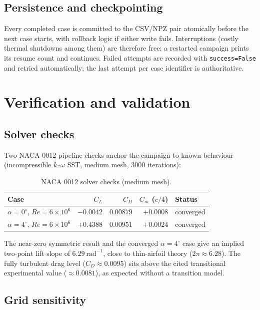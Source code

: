 \documentclass[11pt,a4paper]{article}
\begin{document}
\subsection{Persistence and checkpointing}

Every completed case is committed to the CSV/NPZ pair atomically before the
next case starts, with rollback logic if either write fails. Interruptions
(costly thermal shutdowns among them) are therefore free: a restarted
campaign prints its resume count and continues. Failed attempts are recorded
with \texttt{success=False} and retried automatically; the last attempt per
case identifier is authoritative.

\section{Verification and validation}

\subsection{Solver checks}

Two NACA 0012 pipeline checks anchor the campaign to known behaviour
(incompressible $k$--$\omega$ SST, medium mesh, 3000 iterations):

\begin{table}[htbp]
\centering
\caption{NACA 0012 solver checks (medium mesh).}
\label{tab:solverchecks}
\begin{tabular}{lrrrl}
\toprule
Case & $C_L$ & $C_D$ & $C_m$ ($c/4$) & Status \\
\midrule
$\alpha = 0^\circ$, $Re = 6\times10^6$ & $-0.0042$ & $0.00879$ & $+0.0008$ & converged \\
$\alpha = 4^\circ$, $Re = 6\times10^6$ & $+0.4388$ & $0.00951$ & $+0.0024$ & converged \\
\bottomrule
\end{tabular}
\end{table}

The near-zero symmetric result and the converged $\alpha = 4^\circ$ case give
an implied two-point lift slope of $6.29\ \mathrm{rad}^{-1}$, close to
thin-airfoil theory ($2\pi \approx 6.28$). The fully turbulent drag level
($C_D \approx 0.0095$) sits above the cited transitional experimental value
($\approx 0.0081$), as expected without a transition model.

\subsection{Grid sensitivity}
\end{document}
